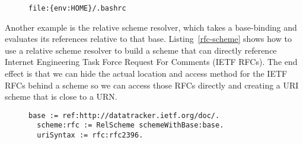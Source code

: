 \documentclass[preprint,authoryear]{acm_proc_article-sp}
\begin{document}

\begin{figure}[htbp]
\begin{lstlisting}[style=L,label=bashrc-pi,caption=Parametrized identifier.]
  file:{env:HOME}/.bashrc
\end{lstlisting}
\end{figure}

Another example is the relative scheme resolver, which takes a base-binding
and evaluates its references relative to that base.  Listing~\ref{rfc-scheme} shows
how to use a relative scheme resolver to build a scheme that can directly
reference Internet Engineering Task Force Request For Comments (IETF RFCs).
The end effect is that we can hide the actual location and access method for
the IETF RFCs behind a scheme so we can access those RFCs directly and
creating a URI scheme that is close to a URN.


\begin{figure}[htbp]
\begin{lstlisting}[style=L,label=rfc-scheme,caption=Retrieving RFC 2396 (URI Syntax) via custom rfc: scheme.]
  base := ref:http://datatracker.ietf.org/doc/.
  scheme:rfc := RelScheme schemeWithBase:base.
  uriSyntax := rfc:rfc2396.
\end{lstlisting}
\end{figure}
\end{document}
